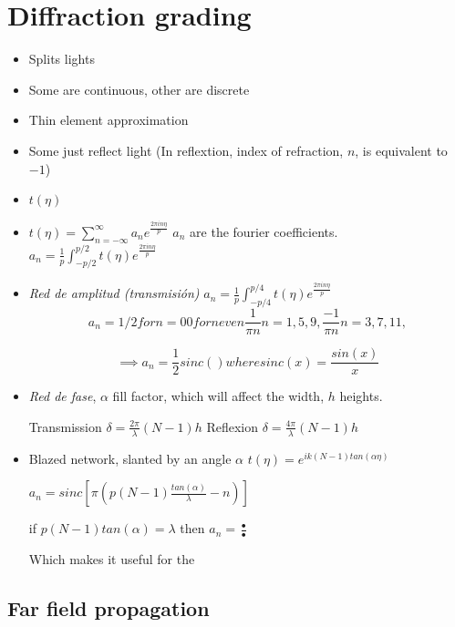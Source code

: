 \documentclass[../main/main.tex]{subfiles}
\begin{document}
\section{Diffraction grading}

\begin{itemize}
	\item Splits lights
	\item Some are continuous, other are discrete
	\item Thin element approximation
	\item Some just reflect light (In reflextion, index of refraction, $n$, is equivalent to $-1$)
	\item $t(\eta)$
	\item $t(\eta) = \sum_{n=-\infty}^{\infty} a_{n}e^{\frac{2\pi i n \eta}{p}}$
	$a_{n}$ are the fourier coefficients. $a_{n} = \frac{1}{p}\int_{-p/2}^{p/2} t(\eta)e^{\frac{2\pi i n \eta}{p}}$
	\item \emph{Red de amplitud (transmisión)} $a_{n} =  \frac{1}{p}\int_{-p/4}^{p/4} t(\eta)e^{\frac{2\pi i n \eta}{p}}$
	\begin{equation}
	a_{n} = 1/2 for n = 0
	0 for n even
	\frac{1}{\pi n} n = 1, 5, 9,
	\frac{-1}{\pi n} n = 3, 7, 11,
	\end{equation}

	\begin{equation}
	\implies a_{n} = \frac{1}{2} sinc()   where sinc(x) = \frac{sin(x)}{x}
	\end{equation}

	\item \emph{Red de fase}, $\alpha$ fill factor, which will affect the width, $h$ heights.

	Transmission $\delta =  \frac{2 \pi }{\lambda} (N-1)h$
	Reflexion $\delta =  \frac{4 \pi }{\lambda} (N-1)h$
	\item Blazed network, slanted by an angle $\alpha$
	$t(\eta) = e^{i k (N-1) tan (\alpha \eta)}$

	$a_{n} = sinc\left[\pi \left(p (N-1) \frac{tan (\alpha)}{\lambda} - n\right)\right]$

	if $p(N-1) tan(\alpha) = \lambda$ then $a_{n} = \frac{•}{•}$

	Which makes it useful for the

\end{itemize}

\subsection{Far field propagation}
\end{document}
